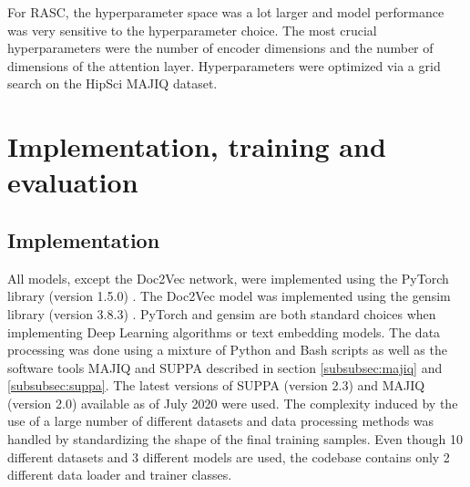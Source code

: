 
For RASC, the hyperparameter space was a lot larger and model performance was very sensitive to the hyperparameter choice. The most crucial hyperparameters were the number of encoder dimensions and the number of dimensions of the attention layer. Hyperparameters were optimized via a grid search on the HipSci MAJIQ dataset.


\section{Implementation, training and evaluation} \label{sec:implementation_details}
\subsection{Implementation} \label{subsec:implementation_details}
All models, except the Doc2Vec network, were implemented using the PyTorch library (version 1.5.0) \cite{pytorch}. The Doc2Vec model was implemented using the gensim library (version 3.8.3) \cite{gensim}. PyTorch and gensim are both standard choices when implementing Deep Learning algorithms or text embedding models. The data processing was done using a mixture of Python and Bash scripts as well as the software tools MAJIQ and SUPPA described in section \ref{subsubsec:majiq} and \ref{subsubsec:suppa}. The latest versions of SUPPA (version 2.3) and MAJIQ (version 2.0) available as of July 2020 were used. The complexity induced by the use of a large number of different datasets and data processing methods was handled by standardizing the shape of the final training samples. Even though 10 different datasets and 3 different models are used, the codebase contains only 2 different data loader and trainer classes.

